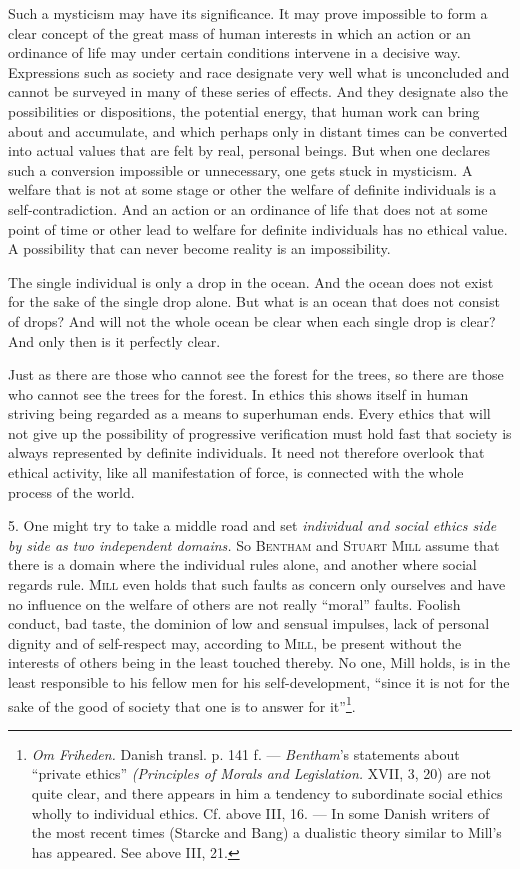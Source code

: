 \documentclass[12pt,a4paper,openany]{book}
\newcommand{\opage}[1]{\marginnote{\footnotesize\textit{[#1]}}}
\begin{document}
Such a mysticism may have its significance. It may prove impossible to form a clear concept of the great mass
of human interests in which an action or an ordinance of life may under certain conditions intervene in a
decisive way. Expressions such as society and race designate very well what is unconcluded and cannot be
surveyed in many of these series of effects. And they designate also the possibilities or dispositions, the
potential energy, that human work can bring about and accumulate, and which perhaps only in distant times can
be converted into actual values that are felt by real, personal beings. But when one declares such a
conversion impossible or unnecessary, one gets stuck in mysticism. A welfare that is not at some stage or other
the welfare of definite individuals is a self-contradiction. And an action or an ordinance of life that does
not at some point of time or other lead to welfare for definite individuals has no ethical value. A possibility
that can never become reality is an impossibility.

The single individual is only a drop in the ocean. And the ocean does not exist for the sake of the single drop
alone. But what is an ocean that does not consist of drops? And will not the whole ocean be clear when each
single drop is clear? And only then is it perfectly clear.

Just as there are those who cannot see the forest for the trees, so there are those who cannot see the trees for
the forest. In ethics this shows itself in human striving being regarded as a means to superhuman ends. Every
ethics that will not give up the possibility of progressive verification must hold fast that society is always
represented by definite individuals. It need not therefore overlook that ethical activity, like all
manifestation of force, is connected with the whole process of the world.

\opage{170}5. One might try to take a middle road and set \textit{individual and social ethics side by side as two
independent domains.} So \textsc{Bentham} and \textsc{Stuart Mill} assume that there is a domain where the
individual rules alone, and another where social regards rule. \textsc{Mill} even holds that such faults as
concern only ourselves and have no influence on the welfare of others are not really ``moral'' faults. Foolish
conduct, bad taste, the dominion of low and sensual impulses, lack of personal dignity and of self-respect may,
according to \textsc{Mill}, be present without the interests of others being in the least touched thereby. No
one, Mill holds, is in the least responsible to his fellow men for his self-development, ``since it is not for
the sake of the good of society that one is to answer for it''\footnote[1]{\textit{Om Friheden.} Danish transl.
p. 141 f. --- \emph{Bentham}'s statements about ``private ethics'' \textit{(Principles of Morals and
Legislation.} XVII, 3, 20) are not quite clear, and there appears in him a tendency to subordinate social ethics
wholly to individual ethics. Cf. above III, 16. --- In some Danish writers of the most recent times (Starcke
and Bang) a dualistic theory similar to Mill's has appeared. See above III, 21.}.
\end{document}
